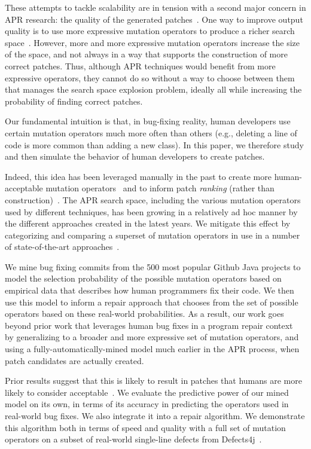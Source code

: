 \documentclass[conference]{IEEEtran}
\begin{document}
These attempts to tackle scalability are in tension with a second major concern
in APR research: the quality of the generated patches~\cite{references}.  One way to
improve output quality is to use more expressive mutation operators to produce a
richer search space~\cite{long16}.  However, more and more expressive mutation
operators increase the size of the 
space, and not always in a way that supports the construction of more correct
patches.  Thus, although APR techniques would benefit from more expressive
operators, they cannot do so without a way to choose between them that manages
the search space explosion problem, ideally all while increasing the probability
of finding correct patches.

Our fundamental intuition is that, in bug-fixing reality, human developers use
certain mutation operators much more often than others (e.g., deleting a line of
code is more common than adding a new class). In this paper, we therefore study
and then simulate the behavior of human developers to create patches.
 
Indeed, this idea has been
leveraged manually in the past to create more human-acceptable mutation
operators~\cite{kim2013} and to inform patch \emph{ranking} (rather than construction)~\cite{xuan16,long16proph}.
The APR search space, including the various mutation
operators used by different techniques, has been growing in a relatively ad hoc 
manner by the different approaches created in the latest years. We mitigate this effect by categorizing and comparing a superset of
mutation operators in use in a number of 
state-of-the-art approaches~\cite{legoues12,Weimer13,kim2013,long16proph}.

We mine bug fixing commits from 
the 500 most popular Github Java projects to model the selection probability of
the possible mutation operators based on 
empirical data that describes how human programmers fix their code.  We then use this
model to inform a repair approach that chooses from the set of possible
operators based on these real-world
probabilities.
As a result, our work goes beyond prior work that leverages human bug
fixes in a program repair context~\cite{kim2013,xuan16,long16proph} by generalizing
to a broader and more expressive set of
mutation operators, and using a fully-automatically-mined model much 
earlier in the APR process, when
patch candidates are actually created.  

Prior results suggest that this is likely to result in patches that
humans are more likely to consider acceptable~\cite{kim2013}.
%
We evaluate the predictive power of our mined model on its own, in terms of its
accuracy in predicting the operators used in real-world bug fixes.  We also
integrate it into a repair algorithm. We demonstrate this algorithm both in terms of speed and quality with a full set of mutation
operators on a subset of real-world single-line defects
from Defects4j~\cite{just14}. 
\end{document}
